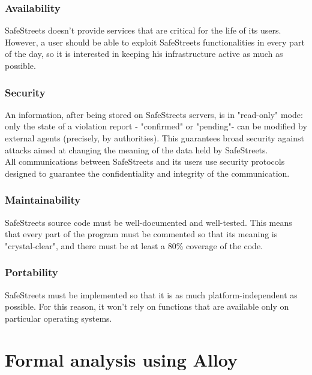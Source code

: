 \documentclass{article}
\begin{document}
			\subsubsection{Availability}
			SafeStreets doesn't provide services that are critical for the life of its users. However, a user should be able to exploit SafeStreets functionalities in every part of the day, so it is interested in keeping his infrastructure active as much as possible.
			
			\subsubsection{Security}
			An information, after being stored on SafeStreets servers, is in "read-only" mode: only the state of a violation report - "confirmed" or "pending"- can be modified by external agents (precisely, by authorities). This guarantees broad security against attacks aimed at changing the meaning of the data held by SafeStreets.\\
			All communications between SafeStreets and its users use security protocols designed to guarantee the confidentiality and integrity of the communication.
			
			\subsubsection{Maintainability}
			SafeStreets source code must be well-documented and well-tested. This means that every part of the program must be commented so that its meaning is "crystal-clear", and there must be at least a 80\% coverage of the code.
			
			\subsubsection{Portability}
			SafeStreets must be implemented so that it is as much platform-independent as possible. For this reason, it won't rely on functions that are available only on particular operating systems.
	\newpage
	\section{Formal analysis using Alloy}
	
\end{document}
